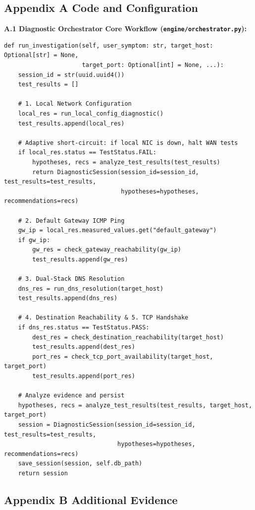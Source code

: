 \documentclass[
]{article}
\begin{document}
\subsection{Appendix A Code and Configuration}\label{appendix-a-code-and-configuration}

\textbf{A.1 Diagnostic Orchestrator Core Workflow (\texttt{engine/orchestrator.py}):}
\begin{verbatim}
def run_investigation(self, user_symptom: str, target_host: Optional[str] = None,
                      target_port: Optional[int] = None, ...):
    session_id = str(uuid.uuid4())
    test_results = []
    
    # 1. Local Network Configuration
    local_res = run_local_config_diagnostic()
    test_results.append(local_res)
    
    # Adaptive short-circuit: if local NIC is down, halt WAN tests
    if local_res.status == TestStatus.FAIL:
        hypotheses, recs = analyze_test_results(test_results)
        return DiagnosticSession(session_id=session_id, test_results=test_results,
                                 hypotheses=hypotheses, recommendations=recs)
                                 
    # 2. Default Gateway ICMP Ping
    gw_ip = local_res.measured_values.get("default_gateway")
    if gw_ip:
        gw_res = check_gateway_reachability(gw_ip)
        test_results.append(gw_res)
        
    # 3. Dual-Stack DNS Resolution
    dns_res = run_dns_resolution(target_host)
    test_results.append(dns_res)
    
    # 4. Destination Reachability & 5. TCP Handshake
    if dns_res.status == TestStatus.PASS:
        dest_res = check_destination_reachability(target_host)
        test_results.append(dest_res)
        port_res = check_tcp_port_availability(target_host, target_port)
        test_results.append(port_res)
        
    # Analyze evidence and persist
    hypotheses, recs = analyze_test_results(test_results, target_host, target_port)
    session = DiagnosticSession(session_id=session_id, test_results=test_results,
                                hypotheses=hypotheses, recommendations=recs)
    save_session(session, self.db_path)
    return session
\end{verbatim}

\subsection{Appendix B Additional Evidence}\label{appendix-b-additional-evidence}
\end{document}
